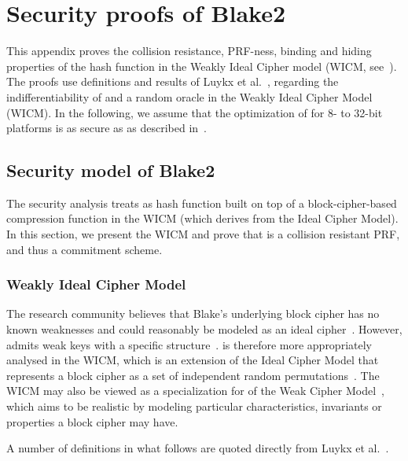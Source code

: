 
\chapter{Security proofs of Blake2}\label{appendix:blake}

This appendix proves the collision resistance, PRF-ness, binding and hiding properties of the  hash function in the Weakly Ideal Cipher model (WICM, see~\cite{luykx2016security}). The proofs use definitions and results of Luykx et al.~\cite{luykx2016security}, regarding the indifferentiability of  and a random oracle in the Weakly Ideal Cipher Model (WICM). In the following, we assume that the optimization of  for 8- to 32-bit platforms is as secure as  as described in~\cite{luykx2016security}.

\section{Security model of Blake2}\label{appendix:blake:secmod}

The security analysis treats  as hash function built on top of a block-cipher-based compression function in the WICM (which derives from the Ideal Cipher Model). In this section, we present the WICM and prove that  is a collision resistant PRF, and thus a commitment scheme.

\subsection{Weakly Ideal Cipher Model}\label{appendix:blake:secmod:WICM}

The research community believes that Blake’s underlying block cipher has no known weaknesses and could reasonably be modeled as an ideal cipher~\cite[Section 2.1]{luykx2016security}. However,  admits weak keys with a specific structure~\cite[Section 2.1]{luykx2016security}.  is therefore more appropriately analysed in the WICM, which is an extension of the Ideal Cipher Model that represents a block cipher as a set of independent random permutations~\cite{holenstein2011equivalence}. The WICM may also be viewed as a specialization for  of the Weak Cipher Model~\cite{mennink2015impact}, which aims to be realistic by modeling particular characteristics, invariants or properties a block cipher may have.

A number of definitions in what follows are quoted directly from Luykx et al.~\cite{luykx2016security}.

